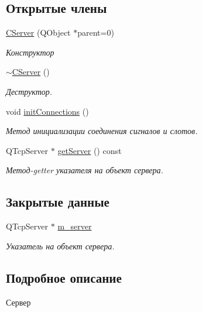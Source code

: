 \subsection*{Открытые члены}
\begin{DoxyCompactItemize}
\item 
\hyperlink{class_c_server_a743d64a8f7c949de3de873735f726fcf}{C\+Server} (Q\+Object $\ast$parent=0)
\begin{DoxyCompactList}\small\item\em Конструктор \end{DoxyCompactList}\item 
\hyperlink{class_c_server_af6da9f8b52bdc049e21cd7c687ef4d4b}{$\sim$\+C\+Server} ()
\begin{DoxyCompactList}\small\item\em Деструктор. \end{DoxyCompactList}\item 
void \hyperlink{class_c_server_a32c8f33336a76b36c2653553b970e76c}{init\+Connections} ()
\begin{DoxyCompactList}\small\item\em Метод инициализации соединения сигналов и слотов. \end{DoxyCompactList}\item 
Q\+Tcp\+Server $\ast$ \hyperlink{class_c_server_a3ad6eca8c26fc7852aaf1c626c84e220}{get\+Server} () const
\begin{DoxyCompactList}\small\item\em Метод-\/getter указателя на объект сервера. \end{DoxyCompactList}\end{DoxyCompactItemize}
\subsection*{Закрытые данные}
\begin{DoxyCompactItemize}
\item 
Q\+Tcp\+Server $\ast$ \hyperlink{class_c_server_a0ee5b734ddfc86fc181e767700f7a46b}{m\+\_\+server}
\begin{DoxyCompactList}\small\item\em Указатель на объект сервера. \end{DoxyCompactList}\end{DoxyCompactItemize}


\subsection{Подробное описание}
Сервер 


